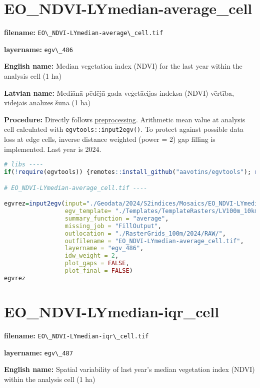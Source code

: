 \documentclass[
]{book}
\newcommand{\passthrough}[1]{#1}
\begin{document}
\section{EO\_NDVI-LYmedian-average\_cell}\label{ch06.486}

\textbf{filename:} \passthrough{\lstinline!EO\_NDVI-LYmedian-average\_cell.tif!}

\textbf{layername:} \passthrough{\lstinline!egv\_486!}

\textbf{English name:} Median vegetation index (NDVI) for the last year within the analysis cell (1 ha)

\textbf{Latvian name:} Mediānā pēdējā gada veģetācijas indeksa (NDVI) vērtība, vidējais analīzes šūnā (1 ha)

\textbf{Procedure:} Directly follows \hyperref[Ch04.13]{preprocessing}. Arithmetic mean value at analysis cell
calculated with \passthrough{\lstinline!egvtools::input2egv()!}. To protect against possible data loss at edge cells,
inverse distance weighted (power = 2) gap filling is implemented. Last year is 2024.

\begin{lstlisting}[language=R]
# libs ----
if(!require(egvtools)) {remotes::install_github("aavotins/egvtools"); require(egvtools)}

# EO_NDVI-LYmedian-average_cell.tif ----

egvrez=input2egv(input="./Geodata/2024/S2indices/Mosaics/EO_NDVI-LYmedian.tif",
                 egv_template= "./Templates/TemplateRasters/LV100m_10km.tif",
                 summary_function = "average",
                 missing_job = "FillOutput",
                 outlocation = "./RasterGrids_100m/2024/RAW/",
                 outfilename = "EO_NDVI-LYmedian-average_cell.tif",
                 layername = "egv_486",
                 idw_weight = 2,
                 plot_gaps = FALSE,
                 plot_final = FALSE)
egvrez
\end{lstlisting}

\section{EO\_NDVI-LYmedian-iqr\_cell}\label{ch06.487}

\textbf{filename:} \passthrough{\lstinline!EO\_NDVI-LYmedian-iqr\_cell.tif!}

\textbf{layername:} \passthrough{\lstinline!egv\_487!}

\textbf{English name:} Spatial variability of last year's median vegetation index (NDVI) within the analysis cell (1 ha)
\end{document}
